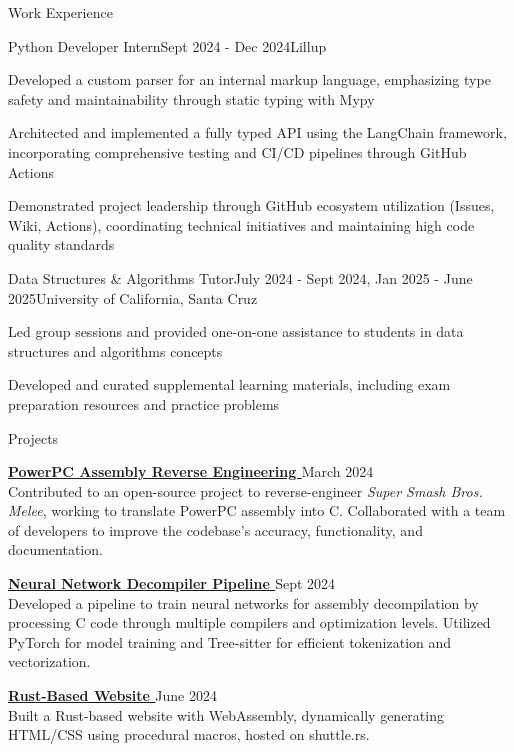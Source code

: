 \documentclass{resume}
\newcommand{\scaledfaExternalLink}{\raisebox{0.1\height}{\scalebox{0.7}{\faExternalLink*}}}
\begin{document}
\begin{rSection}{Work Experience}

	\begin{rSubsection}{Python Developer Intern}{Sept 2024 - Dec 2024}{Lillup}{}
		\item Developed a custom parser for an internal markup language, emphasizing type safety and maintainability through static typing with Mypy
		\item Architected and implemented a fully typed API using the LangChain framework, incorporating comprehensive testing and CI/CD pipelines through GitHub Actions
		\item Demonstrated project leadership through GitHub ecosystem utilization (Issues, Wiki, Actions), coordinating technical initiatives and maintaining high code quality standards
	\end{rSubsection}

	\begin{rSubsection}{Data Structures \& Algorithms Tutor}{July 2024 - Sept 2024, Jan 2025 - June 2025}{University of California, Santa Cruz}{}
		\item Led group sessions and provided one-on-one assistance to students in data structures and algorithms concepts
		\item Developed and curated supplemental learning materials, including exam preparation resources and practice problems
	\end{rSubsection}

\end{rSection}

\begin{rSection}{Projects}

	\item {\bf \href{https://github.com/search?q=repo\%3Adoldecomp\%2Fmelee++author\%3Awyatt-avilla&type=pullrequests&ref=advsearch}{PowerPC Assembly Reverse Engineering \scaledfaExternalLink}} {\hfill March 2024} \\
	Contributed to an open-source project to reverse-engineer \textit{Super Smash Bros. Melee}, working to translate PowerPC assembly into C. Collaborated with a team of developers to improve the codebase's accuracy, functionality, and documentation.

	\item {\bf \href{https://github.com/wyatt-avilla/sunbird}{Neural Network Decompiler Pipeline \scaledfaExternalLink}} {\hfill Sept 2024} \\
	Developed a pipeline to train neural networks for assembly decompilation by processing C code through multiple compilers and optimization levels. Utilized PyTorch for model training and Tree-sitter for efficient tokenization and vectorization.

	\item {\bf \href{https://github.com/wyatt-avilla/feframe}{Rust-Based Website \scaledfaExternalLink}} {\hfill June 2024} \\
	Built a Rust-based website with WebAssembly, dynamically generating HTML/CSS using procedural macros, hosted on shuttle.rs.

\end{rSection}
\end{document}
